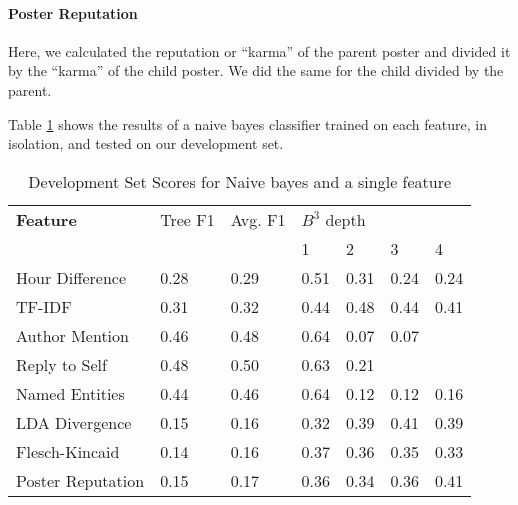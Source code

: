 \documentclass[10pt]{article}
\begin{document}
\paragraph{Poster Reputation} Here, we calculated the reputation or ``karma'' of the
parent poster and divided it by the ``karma'' of the child poster. We did the same
for the child divided by the parent.

Table \ref{table:perfeature} shows the results of a naive bayes classifier trained
on each feature, in isolation, and tested on our development set.

\begin{table}[h]\footnotesize
 \begin{tabular}{| l | l | l | l | l | l | l |} 
   \hline
   \textbf{Feature} & Tree F1 & Avg. F1 & \multicolumn{4}{l|}{$B^3$ depth} \\
                      & & & 1 & 2 & 3 & 4\\
   \hline
      Hour Difference & 0.28 & 0.29 & 0.51 & 0.31 & 0.24 & 0.24 \\
               TF-IDF & 0.31 & 0.32 & 0.44 & 0.48 & 0.44 & 0.41 \\ 
       Author Mention & 0.46 & 0.48 & 0.64 & 0.07 & 0.07 & \\
        Reply to Self & 0.48 & 0.50 & 0.63 & 0.21 & & \\
Named Entities & 0.44 & 0.46 & 0.64 & 0.12 & 0.12 & 0.16 \\
               LDA Divergence & 0.15 & 0.16 & 0.32 & 0.39 & 0.41 & 0.39 \\
         Flesch-Kincaid & 0.14 & 0.16 & 0.37 & 0.36 & 0.35 & 0.33 \\
            Poster Reputation & 0.15 & 0.17 & 0.36 & 0.34 & 0.36 & 0.41 \\
   \hline
  \end{tabular}
  \caption{Development Set Scores for Naive bayes and a single feature}
  \label{table:perfeature}
\end{table}
\end{document}

